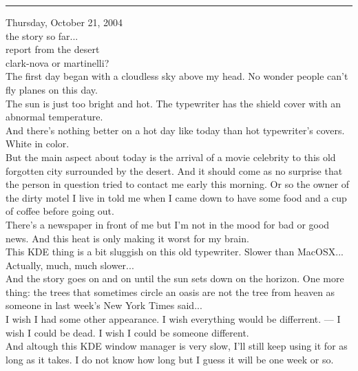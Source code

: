 \documentclass[11pt,twoside,a4paper]{book}
\begin{document}
\begin{multicols*}{2}
\begin{center} \rule{0.45\textwidth}{0.001cm} \end{center}

Thursday, October 21, 2004 ~\\

{\large the story so far...} ~\\ %

{\Large report from the desert} ~\\

{\large clark-nova or martinelli?} ~\\

The first day began with a cloudless sky above my head. No wonder people can't fly planes on this day. ~\\
The sun is just too bright and hot. The typewriter has the shield cover with an abnormal temperature. ~\\
And there's nothing better on a hot day like today than hot typewriter's covers. White in color. ~\\

But the main aspect about today is the arrival of a movie celebrity to this old forgotten city surrounded by the desert. And it should come as no surprise that the person in question tried to contact me early this morning. Or so the owner of the dirty motel I live in told me when I came down to have some food and a cup of coffee before going out. ~\\
There's a newspaper in front of me but I'm not in the mood for bad or good news. And this heat is only making it worst for my brain. ~\\

This KDE thing is a bit sluggish on this old typewriter. Slower than MacOSX... Actually, much, much slower... ~\\

And the story goes on and on until the sun sets down on the horizon. One more thing: the trees that sometimes circle an oasis are not the tree from heaven as someone in last week's New York Times said... ~\\

I wish I had some other appearance. I wish everything would be differrent. --- I wish I could be dead. I wish I could be someone different. ~\\

And altough this KDE window manager is very slow, I'll still keep using it for as long as it takes. I do not know how long but I guess it will be one week or so. ~\\


\end{multicols*}
\end{document}

